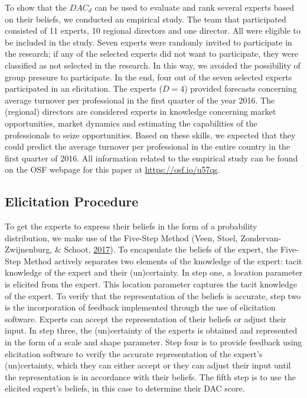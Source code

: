 \documentclass[openright,titlepage,12pt,a4paper]{book}
\begin{document}
To show that the \(DAC_d\) can be used to evaluate and rank several experts based on their beliefs, we conducted an empirical study. The team that participated consisted of 11 experts, 10 regional directors and one director. All were eligible to be included in the study. Seven experts were randomly invited to participate in the research; if any of the selected experts did not want to participate, they were classified as not selected in the research. In this way, we avoided the possibility of group pressure to participate. In the end, four out of the seven selected experts participated in an elicitation. The experts (\(D = 4\)) provided forecasts concerning average turnover per professional in the first quarter of the year 2016. The (regional) directors are considered experts in knowledge concerning market opportunities, market dynamics and estimating the capabilities of the professionals to seize opportunities. Based on these skills, we expected that they could predict the average turnover per professional in the entire country in the first quarter of 2016. All information related to the empirical study can be found on the OSF webpage for this paper at \url{https://osf.io/u57qs}.

\hypertarget{elicitation-procedure}{%
\subsection{Elicitation Procedure}\label{elicitation-procedure}}

To get the experts to express their beliefs in the form of a probability distribution, we make use of the Five-Step Method (Veen, Stoel, Zondervan-Zwijnenburg, \& Schoot, \protect\hyperlink{ref-veen_proposal_2017}{2017}). To encapsulate the beliefs of the expert, the Five-Step Method actively separates two elements of the knowledge of the expert: tacit knowledge of the expert and their (un)certainty. In step one, a location parameter is elicited from the expert. This location parameter captures the tacit knowledge of the expert. To verify that the representation of the beliefs is accurate, step two is the incorporation of feedback implemented through the use of elicitation software. Experts can accept the representation of their beliefs or adjust their input. In step three, the (un)certainty of the experts is obtained and represented in the form of a scale and shape parameter. Step four is to provide feedback using elicitation software to verify the accurate representation of the expert's (un)certainty, which they can either accept or they can adjust their input until the representation is in accordance with their beliefs. The fifth step is to use the elicited expert's beliefs, in this case to determine their DAC score.
\end{document}
